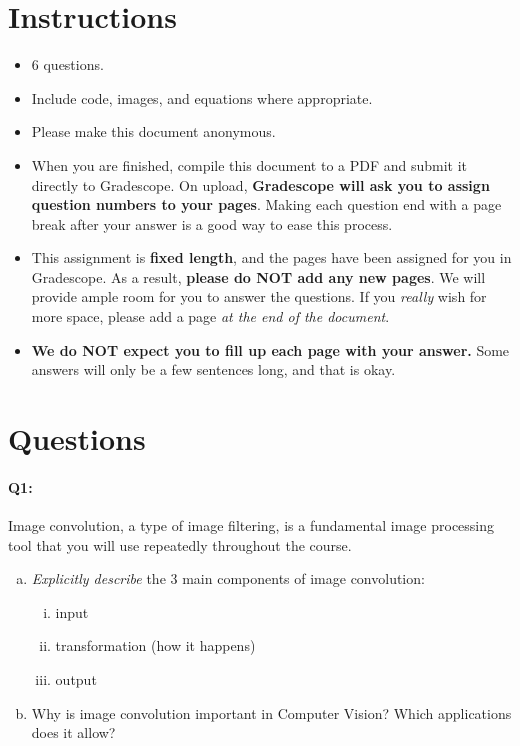 \maketitle
\vspace{-3cm}
\thispagestyle{fancy}

\section*{Instructions}
\begin{itemize}
  \item 6 questions.
  \item Include code, images, and equations where appropriate.
  \item Please make this document anonymous.
  \item When you are finished, compile this document to a PDF and submit it directly to Gradescope. On upload, \textbf{Gradescope will ask you to assign question numbers to your pages}. Making each question end with a page break after your answer is a good way to ease this process.
  \item This assignment is \textbf{fixed length}, and the pages have been assigned for you in Gradescope. As a result, \textbf{please do NOT add any new pages}. We will provide ample room for you to answer the questions. If you \emph{really} wish for more space, please add a page \emph{at the end of the document}.
  \item \textbf{We do NOT expect you to fill up each page with your answer.} Some answers will only be a few sentences long, and that is okay.
\end{itemize}

\section*{Questions}

\paragraph{Q1:} Image convolution, a type of image filtering, is a fundamental image processing tool that you will use repeatedly throughout the course.

\begin{enumerate}[(a)]
\item \emph{Explicitly describe} the 3 main components of image convolution:
\begin{enumerate}[(i)]
    \item input
    \item transformation (how it happens)
    \item output
\end{enumerate}
\item Why is image convolution important in Computer Vision? Which applications does it allow?
\end{enumerate}


